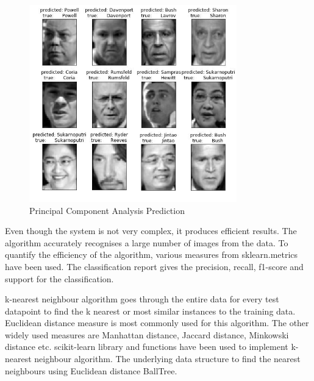\documentclass[conference]{IEEEtran}
\begin{document}
\begin{figure}[h!]
 \centering
 \includegraphics[width = 9cm]{PCA_pred.JPG}
 \caption{ Principal Component Analysis Prediction}
 \label{fig 7: Principal Component Analysis Prediction}
\end{figure}

Even though the system is not very complex, it produces efficient results. The algorithm accurately recognises a large number of images from the data. To quantify the efficiency of the algorithm, various measures from sklearn.metrics have been used. The classification report gives the precision, recall, f1-score and support for the classification. 

k-nearest neighbour algorithm goes through the entire data for every test datapoint to find the k nearest or most similar instances to the training data. Euclidean distance measure is most commonly used for this algorithm. The other widely used measures are Manhattan distance, Jaccard distance, Minkowski distance etc. scikit-learn library and functions have been used to implement k-nearest neighbour algorithm. The underlying data structure to find the nearest neighbours using Euclidean distance BallTree. \cite{ageitgey_2018}
\end{document}
